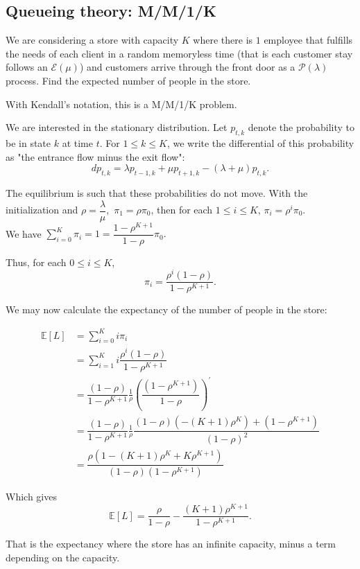\subsection{Queueing theory: M/M/1/K}

\begin{tcolorbox}[width=\linewidth, sharp corners=all, colback=white!95!black]
We are considering a store with capacity $K$ where there is $1$ employee that fulfills the needs of each client in a random memoryless time (that is each customer stay follows an $\mathcal{E}(\mu)$) and customers arrive through the front door as a $\mathcal{P}(\lambda)$ process. Find the expected number of people in the store.
\end{tcolorbox}

With Kendall's notation, this is a M/M/1/K problem.

We are interested in the stationary distribution. Let $p_{t,k}$ denote the probability to be in state $k$ at time $t$. For $1\le k \le K$, we write the differential of this probability as "the entrance flow minus the exit flow":
$$dp_{t,k} = \lambda p_{t-1,k} + \mu p_{t+1,k} - (\lambda+\mu) p_{t,k}.$$

The equilibrium is such that these probabilities do not move. With the initialization and $\rho = \dfrac{\lambda}{\mu},$ $\pi_1 = \rho\pi_0$, then for each $1\le i \le K$, $\pi_i = \rho^{i} \pi_0$.\\
We have $\sum_{i=0}^K \pi_i = 1 = \dfrac{1-\rho^{K+1}}{1-\rho}\pi_0.$

Thus, for each $0\le i \le K$, $$\pi_i = \dfrac{\rho^{i}(1-\rho)}{1-\rho^{K+1}}.$$

We may now calculate the expectancy of the number of people in the store: 

\begin{align*}
    \mathbb{E}[L] &= \displaystyle \sum_{i=0}^K i \pi_i\\
    &= \displaystyle \sum_{i=1}^K i \dfrac{\rho^{i}(1-\rho)}{1-\rho^{K+1}}\\
    &= \dfrac{(1-\rho)}{1-\rho^{K+1}} \frac1{\rho} \left(\dfrac{(1-\rho^{K+1})}{1-\rho}\right)^{'}\\
    &= \dfrac{(1-\rho)}{1-\rho^{K+1}} \frac1{\rho} \dfrac{(1-\rho)(-(K+1)\rho^K) + (1-\rho^{K+1})}{(1-\rho)^2}\\
    &= \dfrac{\rho(1-(K+1)\rho^K+K\rho^{K+1})}{(1-\rho)(1-\rho^{K+1})}
\end{align*}

Which gives $$\mathbb{E}[L] = \dfrac\rho{1-\rho}-\frac{(K+1)\rho^{K+1}}{1-\rho^{K+1}}.$$

That is the expectancy where the store has an infinite capacity, minus a term depending on the capacity.